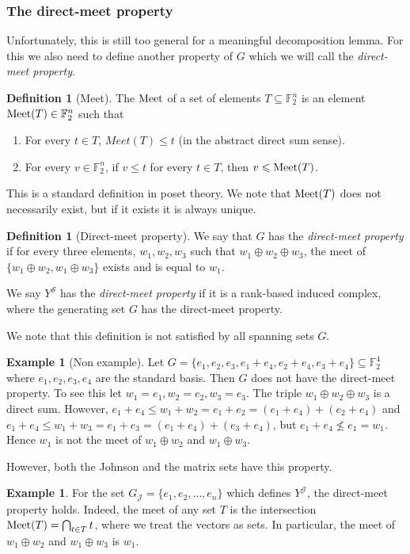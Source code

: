 \documentclass[10pt,a4paper]{article}
\theoremstyle{definition}
\newtheorem{definition}[theorem]{Definition}
\newtheorem{example}[theorem]{Example}
\theoremstyle{remark}
\newcommand{\Authornotecolored}[3]{{\sffamily\small\color{#1}{[#2: #3]}}}
\newcommand{\Authornotecolored}[3]{}
\newcommand{\Ynote}{\Authornotecolored{Purple}{Y}}
\newcommand{\Snote}{\Authornotecolored{Green}{S}}
\newcommand{\snote}{\Snote}
\newcommand{\set}[1]{\{#1\}}
\newcommand{\F}{\mathbb{F}}
\renewcommand{\leq}{\leqslant}
\numberwithin{equation}{section}
\def\Y{Y}
\def\Meet{\textup{Meet}}
\begin{document}
\subsubsection{The direct-meet property}
Unfortunately, this is still too general for a meaningful decomposition lemma. For this we also need to define another property of \(G\) which we will call the \emph{direct-meet property}.

\begin{definition}[Meet]
    The \(\Meet\) of a set of elements \(T \subseteq \F_2^n\) is an element \(\Meet(T) \in \F_2^n\) such that \begin{enumerate}
        \item For every \(t \in T\), \(Meet(T) \leq t\) (in the abstract direct sum sense). 
        \item For every \(v \in \F_2^n\), if \(v \leq t\) for every \(t \in T\), then \(v \leq \Meet(T)\).  
    \end{enumerate}
\end{definition}
This is a standard definition in poset theory. We note that \(\Meet(T)\) does not necessarily exist, but if it exists it is always unique.

\begin{definition}[Direct-meet property]
    We say that \(G\) has the \emph{direct-meet property} if for every three elements, \(w_1,w_2,w_3\) such that \(w_1 \oplus w_2 \oplus w_3\), the meet of \(\set{w_1 \oplus w_2,w_1 \oplus w_3}\) exists and is equal to \(w_1\).
\end{definition}
We say \(\Y^{\mathcal{S}}\) has the \emph{direct-meet property} if it is a rank-based induced complex, where the generating set \(G\) has the direct-meet property.

We note that this definition is not satisfied by all spanning sets \(G\).
\begin{example}[Non example]
    Let \(G=\set{e_1,e_2,e_3,e_1+e_4,e_2+e_4,e_3+e_4} \subseteq \F_2^4\) where \(e_1,e_2,e_3,e_4\) are the standard basis. Then \(G\) does not have the direct-meet property. To see this let \(w_1=e_1,w_2=e_2,w_3=e_3\). The triple \(w_1 \oplus w_2 \oplus w_3\) is a direct sum. However, \(e_1+e_4 \leq w_1+w_2=e_1+e_2=(e_1+e_4)+(e_2+e_4)\) and \(e_1+e_4 \leq w_1+w_3=e_1+e_3=(e_1+e_4)+(e_3+e_4)\), but \(e_1+e_4 \not \leq e_1 = w_1\). Hence \(w_1\) is not the meet of \(w_1 \oplus w_2\) and \(w_1 \oplus w_3\).
\end{example}

However, both the Johnson and the matrix sets have this property.
\begin{example}
For the set \(G_{\mathcal{J}}=\set{e_1,e_2,\dots,e_n}\) which defines \(\Y^{\mathcal{J}}\), the direct-meet property holds. Indeed, the meet of any set \(T\) is the intersection \(\Meet(T) = \bigcap_{t \in T}t\), where we treat the vectors as sets. In particular, the meet of \(w_1 \oplus w_2\) and \(w_1 \oplus w_3\) is \(w_1\).    
\end{example}
\end{document}
